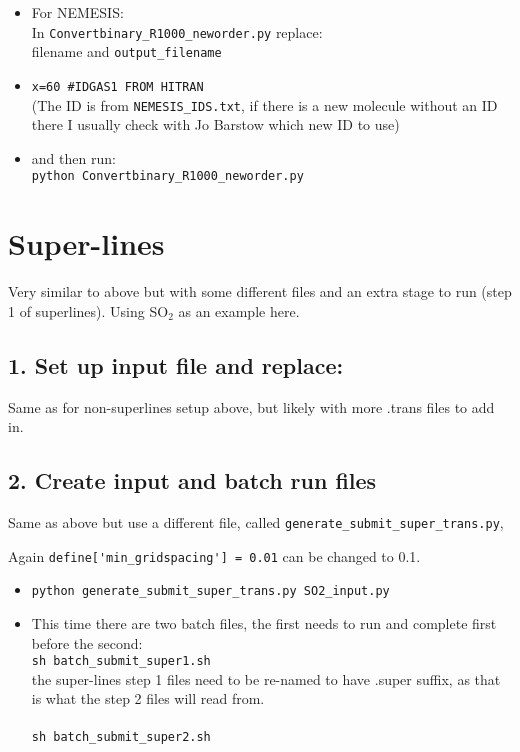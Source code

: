 \documentclass{article}
\begin{document}
\begin{itemize}
\item For NEMESIS: \\
In \verb|Convertbinary_R1000_neworder.py| replace:\\
filename and \verb|output_filename|
\item \verb|x=60 #IDGAS1 FROM HITRAN| \\
(The ID is from \verb|NEMESIS_IDS.txt|, if there is a new molecule without an ID there I usually check with Jo Barstow which new ID to use)
\item and then run: \\
 \verb|python Convertbinary_R1000_neworder.py| 
\end{itemize}

\section{Super-lines}

Very similar to above but with some different files and an extra stage to run (step 1 of superlines). Using SO$_2$ as an example here. 

\subsection*{1. Set up input file and replace:}

Same as for non-superlines setup above, but likely with more .trans files to add in. 

\subsection*{2. Create input and batch run files}

Same as above but use a different file, called \verb|generate_submit_super_trans.py|, 

Again \verb|define['min_gridspacing'] = 0.01| can be changed to 0.1. 
\begin{itemize}
\item \verb|python generate_submit_super_trans.py SO2_input.py|

\item This time there are two batch files, the first needs to run and complete first before the second: \\
\verb|sh batch_submit_super1.sh| \\
the super-lines step 1 files need to be re-named to have .super suffix, as that is what the step 2 files will read from.\\ \\
\verb|sh batch_submit_super2.sh|
\end{itemize}
\end{document}
